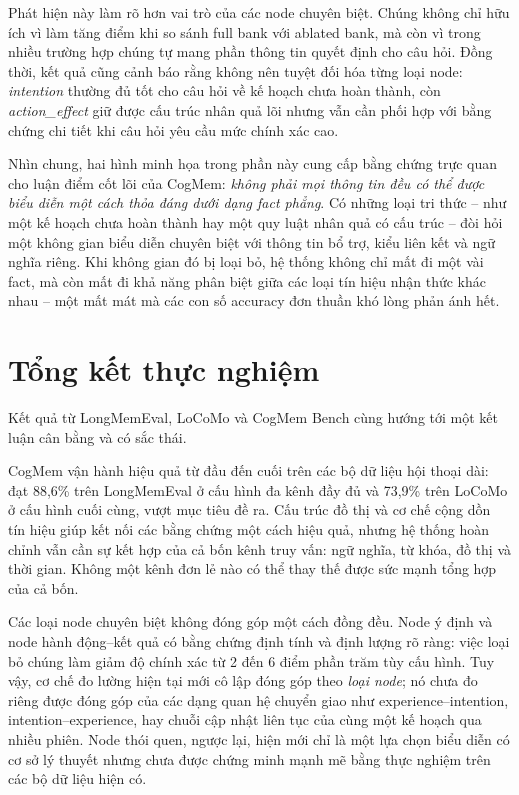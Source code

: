\documentclass[../main.tex]{subfiles}
\begin{document}
Phát hiện này làm rõ hơn vai trò của các node chuyên biệt. Chúng không chỉ hữu ích vì làm tăng điểm khi so sánh full bank với ablated bank, mà còn vì trong nhiều trường hợp chúng tự mang phần thông tin quyết định cho câu hỏi. Đồng thời, kết quả cũng cảnh báo rằng không nên tuyệt đối hóa từng loại node: \textit{intention} thường đủ tốt cho câu hỏi về kế hoạch chưa hoàn thành, còn \textit{action\_effect} giữ được cấu trúc nhân quả lõi nhưng vẫn cần phối hợp với bằng chứng chi tiết khi câu hỏi yêu cầu mức chính xác cao.

Nhìn chung, hai hình minh họa trong phần này cung cấp bằng chứng trực quan cho luận điểm cốt lõi của CogMem: \textit{không phải mọi thông tin đều có thể được biểu diễn một cách thỏa đáng dưới dạng fact phẳng}. Có những loại tri thức -- như một kế hoạch chưa hoàn thành hay một quy luật nhân quả có cấu trúc -- đòi hỏi một không gian biểu diễn chuyên biệt với thông tin bổ trợ, kiểu liên kết và ngữ nghĩa riêng. Khi không gian đó bị loại bỏ, hệ thống không chỉ mất đi một vài fact, mà còn mất đi khả năng phân biệt giữa các loại tín hiệu nhận thức khác nhau -- một mất mát mà các con số accuracy đơn thuần khó lòng phản ánh hết.

\section{Tổng kết thực nghiệm}

Kết quả từ LongMemEval, LoCoMo và CogMem Bench cùng hướng tới một kết luận cân bằng và có sắc thái.

CogMem vận hành hiệu quả từ đầu đến cuối trên các bộ dữ liệu hội thoại dài: đạt 88,6\% trên LongMemEval ở cấu hình đa kênh đầy đủ và 73,9\% trên LoCoMo ở cấu hình cuối cùng, vượt mục tiêu đề ra. Cấu trúc đồ thị và cơ chế cộng dồn tín hiệu giúp kết nối các bằng chứng một cách hiệu quả, nhưng hệ thống hoàn chỉnh vẫn cần sự kết hợp của cả bốn kênh truy vấn: ngữ nghĩa, từ khóa, đồ thị và thời gian. Không một kênh đơn lẻ nào có thể thay thế được sức mạnh tổng hợp của cả bốn.

Các loại node chuyên biệt không đóng góp một cách đồng đều. Node ý định và node hành động--kết quả có bằng chứng định tính và định lượng rõ ràng: việc loại bỏ chúng làm giảm độ chính xác từ 2 đến 6 điểm phần trăm tùy cấu hình. Tuy vậy, cơ chế đo lường hiện tại mới cô lập đóng góp theo \textit{loại node}; nó chưa đo riêng được đóng góp của các dạng quan hệ chuyển giao như experience--intention, intention--experience, hay chuỗi cập nhật liên tục của cùng một kế hoạch qua nhiều phiên. Node thói quen, ngược lại, hiện mới chỉ là một lựa chọn biểu diễn có cơ sở lý thuyết nhưng chưa được chứng minh mạnh mẽ bằng thực nghiệm trên các bộ dữ liệu hiện có.
\end{document}
